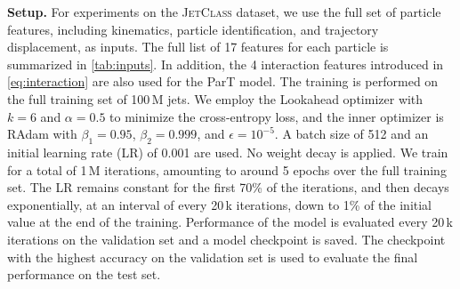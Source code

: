 \documentclass[nohyperref]{article}
\theoremstyle{plain}
\theoremstyle{definition}
\theoremstyle{remark}
\newcommand{\jetclass}{{\textsc{JetClass}}\xspace}
\begin{document}
\textbf{Setup.} For experiments on the \jetclass dataset, we use the full set of particle features, including kinematics, particle identification, and trajectory displacement, as inputs. The full list of 17 features for each particle is summarized in \cref{tab:inputs}. In addition, the 4 interaction features introduced in \cref{eq:interaction} are also used for the ParT model. The training is performed on the full training set of 100\,M jets. We employ the Lookahead optimizer \cite{NEURIPS2019_90fd4f88} with $k=6$ and $\alpha=0.5$ to minimize the cross-entropy loss, and the inner optimizer is RAdam \cite{Liu2020On} with $\beta_1=0.95$, $\beta_2=0.999$, and $\epsilon=10^{{-}5}$. A batch size of 512 and an initial learning rate (LR) of 0.001 are used. No weight decay is applied. We train for a total of 1\,M iterations, amounting to around 5 epochs over the full training set. The LR remains constant for the first 70\% of the iterations, and then decays exponentially, at an interval of every 20\,k iterations, down to 1\% of the initial value at the end of the training. Performance of the model is evaluated every 20\,k iterations on the validation set and a model checkpoint is saved. The checkpoint with the highest accuracy on the validation set is used to evaluate the final performance on the test set. 
\end{document}
